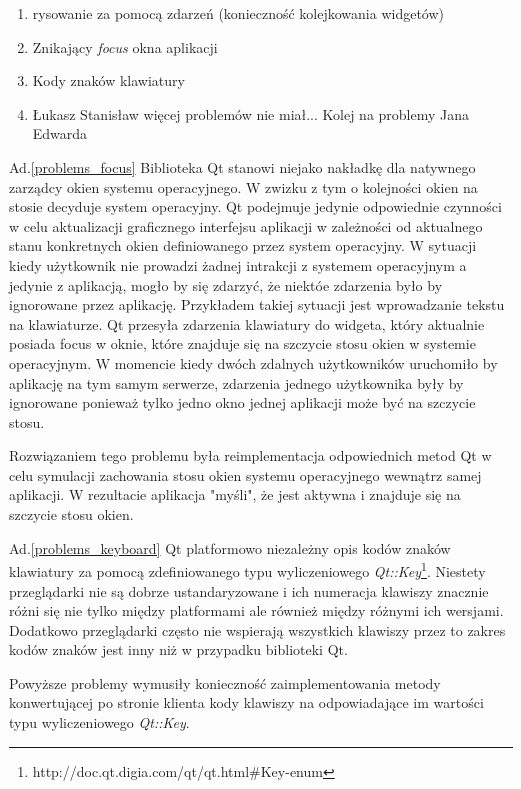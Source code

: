 \begin{enumerate}
  \item rysowanie za pomocą zdarzeń (konieczność kolejkowania widgetów)
  \item Znikający \emph{focus} okna aplikacji
  \label{problems_focus}
  \item Kody znaków klawiatury
  \label{problems_keyboard}
  \item Łukasz Stanisław więcej problemów nie miał... Kolej na problemy Jana Edwarda
\end{enumerate}

Ad.\ref{problems_focus} Biblioteka Qt stanowi niejako nakładkę dla natywnego zarządcy okien systemu operacyjnego. W zwizku z tym o kolejności okien na stosie decyduje system operacyjny. Qt podejmuje jedynie odpowiednie czynności w celu aktualizacji graficznego interfejsu aplikacji w zależności od aktualnego stanu konkretnych okien definiowanego przez system operacyjny. W sytuacji kiedy użytkownik nie prowadzi żadnej intrakcji z systemem operacyjnym a jedynie z aplikacją, mogło by się zdarzyć, że niektóe zdarzenia było by ignorowane przez aplikację. Przykładem takiej sytuacji jest wprowadzanie tekstu na klawiaturze. Qt przesyła zdarzenia klawiatury do widgeta, który aktualnie posiada focus w oknie, które znajduje się na szczycie stosu okien w systemie operacyjnym. W momencie kiedy dwóch zdalnych użytkowników uruchomiło by aplikację na tym samym serwerze, zdarzenia jednego użytkownika były by ignorowane ponieważ tylko jedno okno jednej aplikacji może być na szczycie stosu. 

Rozwiązaniem tego problemu była reimplementacja odpowiednich metod Qt w celu symulacji zachowania stosu okien systemu operacyjnego wewnątrz samej aplikacji. W rezultacie aplikacja "myśli", że jest aktywna i znajduje się na szczycie stosu okien.

Ad.\ref{problems_keyboard} 
Qt platformowo niezależny opis kodów znaków klawiatury za pomocą zdefiniowanego typu wyliczeniowego \emph{Qt::Key}\footnote{http://doc.qt.digia.com/qt/qt.html\#Key-enum}. Niestety przeglądarki nie są dobrze ustandaryzowane i ich numeracja klawiszy znacznie różni się nie tylko między platformami ale również między różnymi ich wersjami. Dodatkowo przeglądarki często nie wspierają wszystkich klawiszy przez to zakres kodów znaków jest inny niż w przypadku biblioteki Qt.

Powyższe problemy wymusiły konieczność zaimplementowania metody konwertującej po stronie klienta kody klawiszy na odpowiadające im wartości typu wyliczeniowego \emph{Qt::Key}.